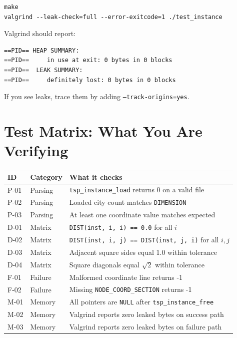 \documentclass[11pt]{article}
\begin{document}
\begin{lstlisting}[style=shellstyle]
make
valgrind --leak-check=full --error-exitcode=1 ./test_instance
\end{lstlisting}

Valgrind should report:
\begin{lstlisting}[style=shellstyle]
==PID== HEAP SUMMARY:
==PID==     in use at exit: 0 bytes in 0 blocks
==PID==  LEAK SUMMARY:
==PID==     definitely lost: 0 bytes in 0 blocks
\end{lstlisting}

If you see leaks, trace them by adding \texttt{--track-origins=yes}.

\newpage

\section{Test Matrix: What You Are Verifying}

\begin{center}
\renewcommand{\arraystretch}{1.6}
\begin{tabularx}{\textwidth}{llX}
\toprule
\textbf{ID} & \textbf{Category} & \textbf{What it checks} \\
\midrule
P-01 & Parsing & \texttt{tsp\_instance\_load} returns 0 on a valid file \\
P-02 & Parsing & Loaded city count matches \texttt{DIMENSION} \\
P-03 & Parsing & At least one coordinate value matches expected \\
D-01 & Matrix  & \texttt{DIST(inst, i, i) == 0.0} for all $i$ \\
D-02 & Matrix  & \texttt{DIST(inst, i, j) == DIST(inst, j, i)} for all $i, j$ \\
D-03 & Matrix  & Adjacent square sides equal 1.0 within tolerance \\
D-04 & Matrix  & Square diagonals equal $\sqrt{2}$ within tolerance \\
F-01 & Failure & Malformed coordinate line returns -1 \\
F-02 & Failure & Missing \texttt{NODE\_COORD\_SECTION} returns -1 \\
M-01 & Memory  & All pointers are \texttt{NULL} after \texttt{tsp\_instance\_free} \\
M-02 & Memory  & Valgrind reports zero leaked bytes on success path \\
M-03 & Memory  & Valgrind reports zero leaked bytes on failure path \\
\bottomrule
\end{tabularx}
\end{center}
\end{document}
